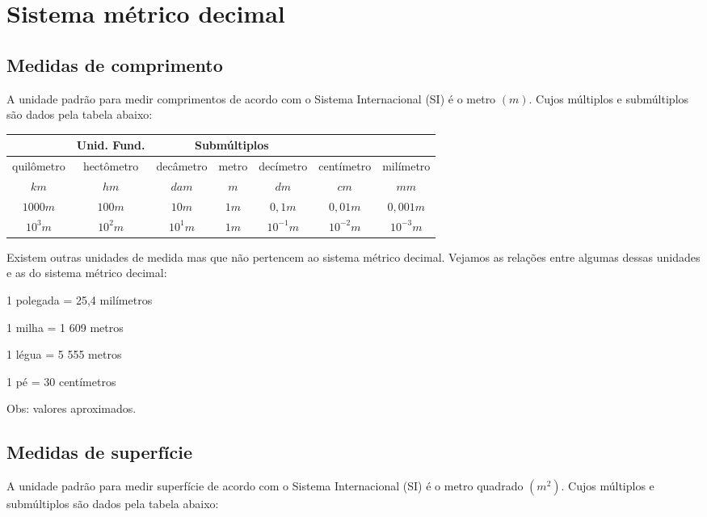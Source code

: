 \newpage
\section{Sistema métrico decimal}

\subsection{Medidas de comprimento}
A unidade padrão para medir comprimentos de acordo com o Sistema Internacional (SI) é o metro $(m)$. Cujos múltiplos e submúltiplos são dados pela tabela abaixo:

 \begin{table}[H]
 \centering
 \begin{tabular}{|c|c|c|c|c|c|c|} \hline
 \rowcolor{cinza}
  \multicolumn{3}{|c|}{\textbf{Múltiplos}} 
 & \multicolumn{1}{|c|}{\textbf{Unid. Fund.}} & \multicolumn{3}{|c|}{\textbf{Submúltiplos}} \\ \hline
 quilômetro & hectômetro & decâmetro & metro & decímetro & centímetro & milímetro \\ \hline
 $km$ & $hm$ & $dam$ & $m$ & $dm$ & $cm$ & $mm$ \\ \hline
 $1000 m$ & $100 m$  & $10 m$ & $1 m$ & $0,1 m$ & $0,01 m$ & $0,001 m$ \\ \hline
 $10^3 m$ & $10^2 m$ & $10^1 m$ & $1 m$ & $10^{-1} m$ & $10^{-2} m$ & $10^{-3} m$ \\ \hline
 \end{tabular}
 \end{table}

 Existem outras unidades de medida mas que não pertencem ao sistema métrico decimal. Vejamos as relações entre algumas dessas unidades e as do sistema métrico decimal:

1 polegada = 25,4 milímetros

1 milha = 1 609 metros

1 légua = 5 555 metros

1 pé = 30 centímetros

Obs: valores aproximados.



\subsection{Medidas de superfície}
A unidade padrão para medir superfície de acordo com o Sistema Internacional (SI) é o metro quadrado $(m^2)$. Cujos múltiplos e submúltiplos são dados pela tabela abaixo:

